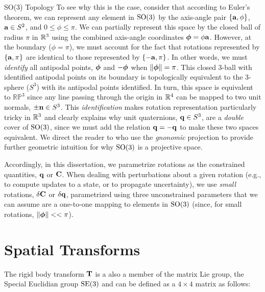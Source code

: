 \begin{remark}{SO(3) Topology}
To see why this is the case, consider that according to Euler's theorem, we can represent any element in $\mathrm{SO}(3)$ by the axis-angle pair $\{\boldsymbol{\mathbf{a}}, \phi\}$, $\boldsymbol{\mathbf{a}} \in S^2$, and $0 \leq \phi \leq \pi$. We can partially represent this space by the closed ball of radius $\pi$ in $\RealNumbers{}^3$ using the combined axis-angle coordinates $\boldsymbol{\mathbf{\phi}} = \phi \boldsymbol{\mathbf{a}}$. However, at the boundary ($\phi = \pi$), we must account for the fact that rotations represented by $\{\boldsymbol{\mathbf{a}}, \pi\}$ are identical to those represented by $\{-\boldsymbol{\mathbf{a}}, \pi\}$. In other words, we must \textit{identify} all antipodal points, $\boldsymbol{\mathbf{\phi}}$ and $-\boldsymbol{\mathbf{\phi}}$ when $\left\Vert\boldsymbol{\mathbf{\phi}}\right\Vert = \pi$. This closed 3-ball with identified antipodal points on its boundary is topologically equivalent to the 3-sphere ($S^3$) with its antipodal points identified. In turn, this space is equivalent to $\mathbb{RP}^3$ since any line passing through the origin in $\RealNumbers^4$ can be mapped to two unit normals, $\pm \boldsymbol{\mathbf{n}} \in S^3$.
This \textit{identification} makes rotation representation particularly tricky in $\RealNumbers{}^3$ and clearly explains why unit quaternions, $\boldsymbol{\mathbf{q}} \in S^3$, are a \textit{double} cover of  $\mathrm{SO}(3)$, since we must add the relation $\boldsymbol{\mathbf{q}} = -\boldsymbol{\mathbf{q}}$ to make these two spaces equivalent. We direct the reader to \cite{Hartley2013-rc} who use the \textit{gnonomic} projection to provide further geometric intuition for why $\mathrm{SO}(3)$ is a projective space. 
\end{remark}
Accordingly, in this dissertation, we parametrize rotations as the constrained quantities, $\boldsymbol{\mathbf{q}}$ or $\boldsymbol{\mathbf{C}}$. When dealing with perturbations about a given rotation (e.g., to compute updates to a state, or to propagate uncertainty), we use \textit{small} rotations, $\delta \boldsymbol{\mathbf{C}}$ or $\delta \boldsymbol{\mathbf{q}}$, parametrized using three unconstrained parameters that we can assume are a one-to-one mapping to elements in $\mathrm{SO}(3)$  (since, for small rotations, $\left\Vert\boldsymbol{\mathbf{\phi}}\right\Vert << \pi$).

\section{Spatial Transforms}
The rigid body transform $\boldsymbol{\mathbf{T}}$ is a also a member of the matrix Lie group, the Special Euclidian group $\mathrm{SE}(3)$ and can be defined as a $4 \times 4$ matrix as follows:

